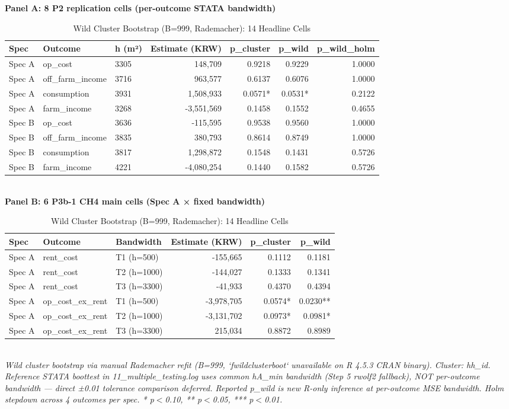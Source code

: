 \begin{table}[t]
\centering
\caption{Wild Cluster Bootstrap (B=999, Rademacher): 14 Headline Cells}
\label{tab:wild_bootstrap_en}
\textbf{Panel A: 8 P2 replication cells (per-outcome STATA bandwidth)}\\
\begin{tabular}{lllrrrr}
\toprule
Spec & Outcome & h (m²) & Estimate (KRW) & p\_cluster & p\_wild & p\_wild\_holm \\
\midrule
Spec A & op\_cost & 3305 & 148,709 & 0.9218 & 0.9229 & 1.0000 \\
Spec A & off\_farm\_income & 3716 & 963,577 & 0.6137 & 0.6076 & 1.0000 \\
Spec A & consumption & 3931 & 1,508,933 & 0.0571* & 0.0531* & 0.2122 \\
Spec A & farm\_income & 3268 & -3,551,569 & 0.1458 & 0.1552 & 0.4655 \\
Spec B & op\_cost & 3636 & -115,595 & 0.9538 & 0.9560 & 1.0000 \\
Spec B & off\_farm\_income & 3835 & 380,793 & 0.8614 & 0.8749 & 1.0000 \\
Spec B & consumption & 3817 & 1,298,872 & 0.1548 & 0.1431 & 0.5726 \\
Spec B & farm\_income & 4221 & -4,080,254 & 0.1440 & 0.1582 & 0.5726 \\
\bottomrule
\end{tabular}\\[1ex]
\textbf{Panel B: 6 P3b-1 CH4 main cells (Spec A × fixed bandwidth)}\\
\begin{tabular}{lllrrr}
\toprule
Spec & Outcome & Bandwidth & Estimate (KRW) & p\_cluster & p\_wild \\
\midrule
Spec A & rent\_cost & T1 (h=500) & -155,665 & 0.1112 & 0.1181 \\
Spec A & rent\_cost & T2 (h=1000) & -144,027 & 0.1333 & 0.1341 \\
Spec A & rent\_cost & T3 (h=3300) & -41,933 & 0.4370 & 0.4394 \\
Spec A & op\_cost\_ex\_rent & T1 (h=500) & -3,978,705 & 0.0574* & 0.0230** \\
Spec A & op\_cost\_ex\_rent & T2 (h=1000) & -3,131,702 & 0.0973* & 0.0981* \\
Spec A & op\_cost\_ex\_rent & T3 (h=3300) & 215,034 & 0.8872 & 0.8989 \\
\bottomrule
\end{tabular}\\
\footnotesize\textit{Wild cluster bootstrap via manual Rademacher refit (B=999, `fwildclusterboot` unavailable on R 4.5.3 CRAN binary). Cluster: hh\_id. Reference STATA boottest in 11\_multiple\_testing.log uses common hA\_min bandwidth (Step 5 rwolf2 fallback), NOT per-outcome bandwidth — direct ±0.01 tolerance comparison deferred. Reported p\_wild is new R-only inference at per-outcome MSE bandwidth. Holm stepdown across 4 outcomes per spec. * p$<$0.10, ** p$<$0.05, *** p$<$0.01.}
\end{table}

